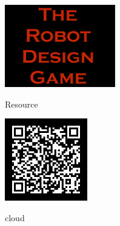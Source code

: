 \documentclass[11pt]{article}
\begin{document}
\color{white}            
    
    \begin{center}
        \vfill
        \vfill
        \vfill

        \includegraphics[height=3.6cm]{rdg_logo}%
        
        \vfill

        

Resource



        \includegraphics[height=3.6cm]{cloud-qr}%

        cloud

        \vfill
    \end{center}
\end{document}
